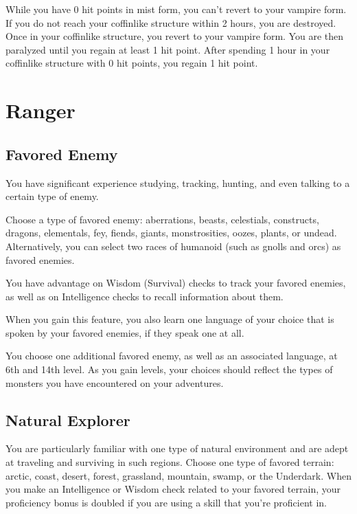 \documentclass[letterpaper,openany,oneside,twocolumn]{book}
\begin{document}
While you have 0 hit points in mist form, you can't revert to your vampire form. If you do not reach your coffinlike structure within 2 hours, you are destroyed. Once in your coffinlike structure, you revert to your vampire form. You are then paralyzed until you regain at least 1 hit point. After spending 1 hour in your coffinlike structure with 0 hit points, you regain 1 hit point.

\section*{Ranger}
\subsection*{Favored Enemy}
You have significant experience studying, tracking, hunting, and even talking to a certain type of enemy.

Choose a type of favored enemy: aberrations, beasts, celestials, constructs, dragons, elementals, fey, fiends, giants, monstrosities, oozes, plants, or undead. Alternatively, you can select two races of humanoid (such as gnolls and orcs) as favored enemies.

You have advantage on Wisdom (Survival) checks to track your favored enemies, as well as on Intelligence checks to recall information about them.

When you gain this feature, you also learn one language of your choice that is spoken by your favored enemies, if they speak one at all.

You choose one additional favored enemy, as well as an associated language, at 6th and 14th level. As you gain levels, your choices should reflect the types of monsters you have encountered on your adventures.

\subsection*{Natural Explorer}
You are particularly familiar with one type of natural environment and are adept at traveling and surviving in such regions. Choose one type of favored terrain: arctic, coast, desert, forest, grassland, mountain, swamp, or the Underdark. When you make an Intelligence or Wisdom check related to your favored terrain, your proficiency bonus is doubled if you are using a skill that you're proficient in.
\end{document}

